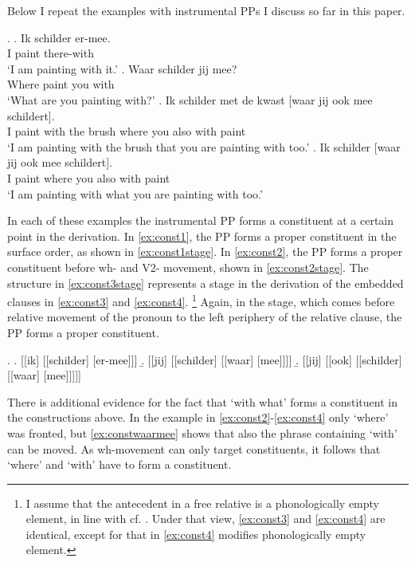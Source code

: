 \documentclass{article}
\begin{document}
Below I repeat the examples with instrumental PPs I discuss so far in this paper.

\ex.
\ag. Ik schilder er-mee.\\
 I paint there-with\\
 `I am painting with it.'\label{ex:const1}
\bg. Waar schilder jij mee?\\
 Where paint you with\\
 `What are you painting with?'\label{ex:const2}
\bg. Ik schilder met de kwast [waar jij ook mee schildert].\\
 I paint with the brush where you also with paint\\
 `I am painting with the brush that you are painting with too.'\label{ex:const3}
\bg. Ik schilder [waar jij ook mee schildert].\\
 I paint where you also with paint\\
 `I am painting with what you are painting with too.'\label{ex:const4}

In each of these examples the instrumental PP forms a constituent at a certain point in the derivation. In \ref{ex:const1}, the PP forms a proper constituent in the surface order, as shown in \ref{ex:const1stage}. In \ref{ex:const2}, the PP forms a proper constituent before wh- and V2- movement, shown in \ref{ex:const2stage}.
The structure in \ref{ex:const3stage} represents a stage in the derivation of the embedded clauses in \ref{ex:const3} and \ref{ex:const4}.
\footnote{I assume that the antecedent in a free relative is a phonologically empty element, in line with cf. \cite{bresnan1978a,groos1981,himmelreich2017}. Under that view, \ref{ex:const3} and \ref{ex:const4} are identical, except for that in \ref{ex:const4} modifies phonologically empty element.}
Again, in the stage, which comes before relative movement of the pronoun to the left periphery of the relative clause, the PP forms a proper constituent.

\ex.
\a. [[ik] [[schilder] [er-mee]]]\label{ex:const1stage}
\b. [[jij] [[schilder] [[waar] [mee]]]]\label{ex:const2stage}
\b. [[jij] [[ook] [[schilder] [[waar] [mee]]]]]\label{ex:const3stage}

There is additional evidence for the fact that  `with what' forms a constituent in the constructions above. In the example in \ref{ex:const2}-\ref{ex:const4} only  `where' was fronted, but \ref{ex:constwaarmee} shows that also the phrase containing  `with' can be moved. As wh-movement can only target constituents, it follows that  `where' and  `with' have to form a constituent.
\end{document}
